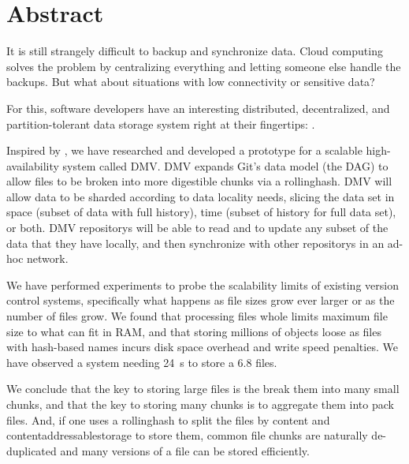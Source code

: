 \chapter{Abstract}

\glsunsetall
{}


It is still strangely difficult to backup and synchronize data. Cloud computing
solves the problem by centralizing everything and letting someone else handle
the backups. But what about situations with low connectivity or sensitive data?


For this, software developers have an interesting distributed, decentralized,
and partition-tolerant data storage system right at their fingertips:
.


Inspired by , we have researched and
developed a prototype for a scalable high-availability system called \gls{DMV}.
\gls{DMV} expands Git's data model (the \acrshort{DAG}) to allow files to be
broken into more digestible chunks via a \gls{rollinghash}. \gls{DMV} will allow
data to be sharded according to data locality needs, slicing the data set in
space (subset of data with full history), time (subset of history for full data
set), or both. \gls{DMV} \glspl{repository} will be able to read and to update
any subset of the data that they have locally, and then synchronize with other
\glspl{repository} in an ad-hoc network.


We have performed experiments to probe the scalability limits of existing
version control systems, specifically what happens as file sizes grow ever
larger or as the number of files grow. We found that processing files whole
limits maximum file size to what can fit in RAM, and that storing millions of
objects loose as files with hash-based names incurs disk space overhead and
write speed penalties. We have observed a system needing \SI{24}{\second} to
store a \SI{6.8}{\kib} files.





We conclude that the key to storing large files is the break them into many
small chunks, and that the key to storing many chunks is to aggregate them into
pack files. And, if one uses a \gls{rollinghash} to split the files by content
and \gls{contentaddressablestorage} to store them, common file chunks are
naturally de-duplicated and many versions of a file can be stored efficiently.

%


\glsresetall

